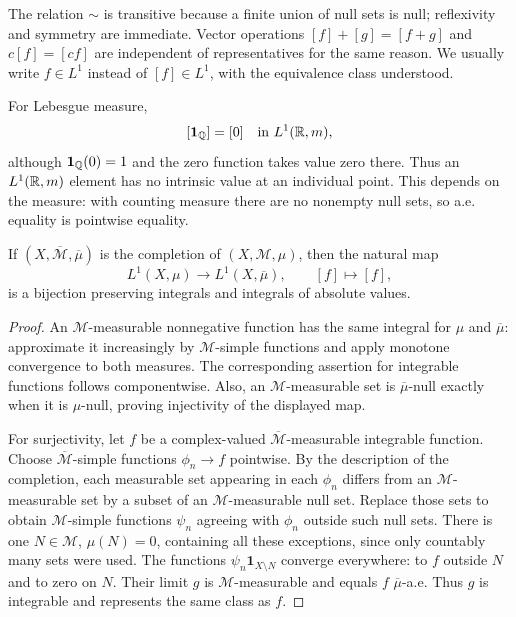 The relation $\sim$ is transitive because a finite union of null sets
is null; reflexivity and symmetry are immediate. Vector operations
$[f]+[g]=[f+g]$ and $c[f]=[cf]$ are independent of representatives for
the same reason. We usually write $f\in L^1$ instead of $[f]\in L^1$,
with the equivalence class understood.

\begin{example}
  For Lebesgue measure,
  \[
    [\mathbf 1_{\mathbb{Q}}]=[0]\quad\text{in }L^1(\mathbb{R},m),
  \]
  although $\mathbf 1_{\mathbb{Q}}(0)=1$ and the zero function takes value
  zero there. Thus an $L^1(\mathbb{R},m)$ element has no intrinsic value
  at an individual point. This depends on the measure: with counting
  measure there are no nonempty null sets, so a.e. equality is
  pointwise equality.
\end{example}

\begin{proposition}
  If $(X,\overline{\mathcal M},\overline\mu)$ is the completion of
  $(X,\mathcal M,\mu)$, then the natural map
  \[
    L^1(X,\mu)\longrightarrow L^1(X,\overline\mu),
    \qquad [f]\longmapsto[f],
  \]
  is a bijection preserving integrals and integrals of absolute values.
\end{proposition}

\begin{proof}
  An $\mathcal M$-measurable nonnegative function has the same integral
  for $\mu$ and $\overline\mu$: approximate it increasingly by
  $\mathcal M$-simple functions and apply monotone convergence to
  both measures. The corresponding assertion for integrable
  functions follows componentwise. Also, an $\mathcal M$-measurable
  set is $\overline\mu$-null exactly when it is $\mu$-null, proving
  injectivity of the displayed map.

  For surjectivity, let $f$ be a complex-valued
  $\overline{\mathcal M}$-measurable integrable function. Choose
  $\overline{\mathcal M}$-simple functions $\phi_n\to f$ pointwise.
  By the description of the completion, each measurable set appearing
  in each $\phi_n$ differs from an $\mathcal M$-measurable set by a
  subset of an $\mathcal M$-measurable null set. Replace those sets to
  obtain $\mathcal M$-simple functions $\psi_n$ agreeing with $\phi_n$
  outside such null sets. There is one $N\in\mathcal M$, $\mu(N)=0$,
  containing all these exceptions, since only countably many sets
  were used. The functions $\psi_n\mathbf 1_{X\setminus N}$ converge
  everywhere: to $f$ outside $N$ and to zero on $N$. Their limit $g$
  is $\mathcal M$-measurable and equals $f$ $\overline\mu$-a.e.
  Thus $g$ is integrable and represents the same class as $f$.
\end{proof}

